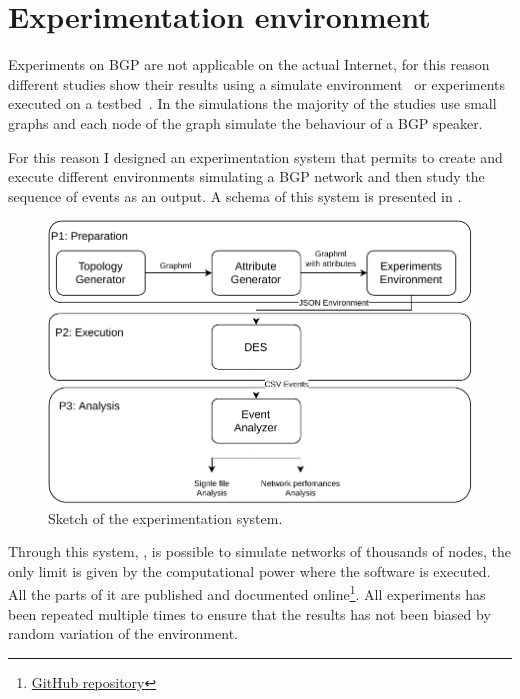 \chapter{Experimentation environment}
\label{cha:des}

Experiments on \ac{BGP} are not applicable on the actual Internet, for this
reason different studies show their results using a simulate environment~\cite{griffin2001experimental}
or experiments executed on a testbed~\cite{milani2020improving}.
In the simulations the majority of the studies use small graphs and each node
of the graph simulate the behaviour of a \ac{BGP} speaker.

For this reason I designed an experimentation system that permits to create and execute
different environments simulating a \ac{BGP} network and then study the sequence
of events as an output.
A schema of this system is presented in .

\begin{figure}[ht]
    \centering
    \includegraphics[scale=0.75]{images/toolchain.pdf}
    \caption{Sketch of the experimentation system.}
    \label{fig:exp_sketch}
\end{figure}

Through this system, , is possible to simulate networks
of thousands of nodes, the only limit is given by the computational power where
the software is executed.
All the parts of it are published and documented
online\footnote{\href{https://github.com/tiamilani/BGPFSM}{GitHub repository}}.
All experiments has been repeated multiple times to ensure that the results
has not been biased by random variation of the environment.


